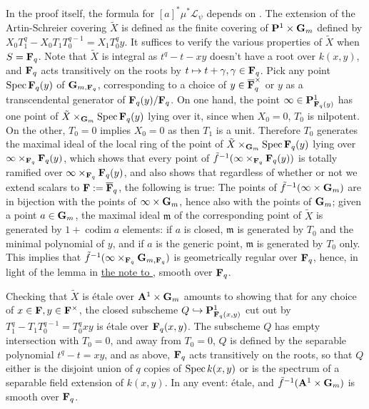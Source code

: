 \documentclass[deligne.tex]{subfiles}
\begin{document}
In the proof itself, the formula for $[a]^*\mu^*\mathscr L_{\psi}$
depends on \cite[1.7.1]{Trig}. The extension of the Artin-Schreier covering
$\tilde X$ is defined as the finite covering of $\mathbf{P}^1\times\mathbf{G}_m$ defined
by $X_0T_1^q-X_0T_1T_0^{q-1}=X_1T_0^qy$. It suffices to verify the various
properties of $\tilde X$ when $S=\mathbf{F}_q$.
Note that $\tilde X$ is integral as $t^q-t-xy$ doesn't have a root over
$k(x,y)$, and $\mathbf{F}_q$ acts transitively on the roots by
$t\mapsto t+\gamma,\gamma\in\mathbf{F}_q$.
Pick any point $\operatorname{Spec}\mathbf{F}_q(y)$ of $\mathbf{G}_{m,\mathbf{F}_q}$, corresponding to a
choice of 
$y\in\overline{\mathbf{F}}_q^\times$ or $y$ as a transcendental generator of
$\mathbf{F}_q(y)/\mathbf{F}_q$. 
On one hand, the point $\infty\in\mathbf{P}^1_{\mathbf{F}_q(y)}$ has one point of
$\tilde X\times_{\mathbf{G}_m}\operatorname{Spec}\mathbf{F}_q(y)$ lying over it, since when $X_0=0$,
$T_0$ is nilpotent.
On the other, $T_0=0$ implies $X_0=0$ as then $T_1$ is a unit.
Therefore $T_0$ generates the maximal ideal of the local ring of the point
of $\tilde X\times_{\mathbf{G}_m}\operatorname{Spec}\mathbf{F}_q(y)$ lying over
$\infty\times_{\mathbf{F}_q}\mathbf{F}_q(y)$, which 
shows that every point of $\tilde f^{-1}(\infty\times_{\mathbf{F}_q}\mathbf{F}_q(y))$ is
totally ramified over $\infty\times_{\mathbf{F}_q}\mathbf{F}_q(y)$, and also shows that
regardless of whether or not we extend scalars to $\mathbf{F}:=\overline{\mathbf{F}}_q$,
the following is true: The points of $\tilde f^{-1}(\infty\times\mathbf{G}_m)$
are in bijection with the points of $\infty\times\mathbf{G}_m$, hence also with
the points of $\mathbf{G}_m$; given a point $a\in\mathbf{G}_m$,
the maximal ideal $\mathfrak m$ of the corresponding point of $\tilde X$ is 
generated by $1+\operatorname{codim} a$ elements: if $a$ is closed,
$\mathfrak m$ is generated by $T_0$ and the minimal polynomial of $y$, and
if $a$ is the generic point, $\mathfrak m$ is generated by $T_0$ only.
This implies that $\tilde f^{-1}(\infty\times_{\mathbf{F}_q}\mathbf{G}_{m,\mathbf{F}_q})$ is
geometrically regular over $\mathbf{F}_q$, hence, in light of the lemma in
\hyperref[BBD:2.2.10]{the note to \cite[2.2.1.0]{BBD}},
smooth over $\mathbf{F}_q$.

Checking that $\tilde X$ is étale over $\mathbf{A}^1\times\mathbf{G}_m$ amounts to showing
that for any choice of $x\in\mathbf{F},y\in\mathbf{F}^\times$, the closed subscheme 
$Q\hookrightarrow\mathbf{P}^1_{\mathbf{F}_q(x,y)}$ cut out by
$T_1^q-T_1T_0^{q-1}=T_0^qxy$ is étale over $\mathbf{F}_q(x,y)$.
The subscheme $Q$ has empty intersection with $T_0=0$, and away from
$T_0=0$, $Q$ is defined by the separable polynomial $t^q-t=xy$, and as
above, $\mathbf{F}_q$ acts transitively on the roots, so that $Q$ either is the
disjoint union of $q$ copies of $\operatorname{Spec} k(x,y)$ or is the spectrum of a 
separable field extension of $k(x,y)$. In any event: étale,
and $\tilde f^{-1}(\mathbf{A}^1\times\mathbf{G}_m)$ is smooth over $\mathbf{F}_q$.
\end{document}
